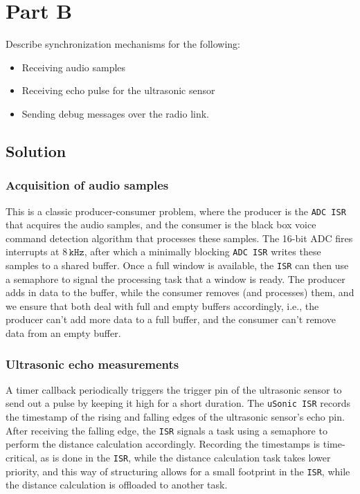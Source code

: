 \section*{Part B}

Describe synchronization mechanisms for the following:
\begin{itemize}[noitemsep, topsep=0pt]
    \item Receiving audio samples
    \item Receiving echo pulse for the ultrasonic sensor
    \item Sending debug messages over the radio link.
\end{itemize}

\subsection*{Solution}

\subsubsection*{Acquisition of audio samples}

This is a classic producer-consumer problem, where the producer is the \texttt{ADC ISR} that acquires the audio samples, and the consumer is the black box voice command detection algorithm that processes these samples.
The 16-bit ADC fires interrupts at \( 8\,\texttt{kHz} \), after which a minimally blocking \texttt{ADC ISR} writes these samples to a shared buffer.
Once a full window is available, the \texttt{ISR} can then use a semaphore to signal the processing task that a window is ready.
The producer adds in data to the buffer, while the consumer removes (and processes) them, and we ensure that both deal with full and empty buffers accordingly, i.e., the producer can't add more data to a full buffer, and the consumer can't remove data from an empty buffer.

\subsubsection*{Ultrasonic echo measurements}

A timer callback periodically triggers the trigger pin of the ultrasonic sensor to send out a pulse by keeping it high for a short duration.
The \texttt{uSonic ISR} records the timestamp of the rising and falling edges  of the ultrasonic sensor's echo pin.
After receiving the falling edge, the \texttt{ISR} signals a task using a semaphore to perform the distance calculation accordingly.
Recording the timestamps is time-critical, as is done in the \texttt{ISR}, while the distance calculation task takes lower priority, and this way of structuring allows for a small footprint in the \texttt{ISR}, while the distance calculation is offloaded to another task.

